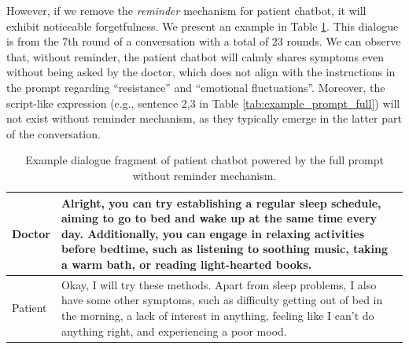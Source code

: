 However, if we remove the \textit{reminder} mechanism for patient chatbot, it will exhibit noticeable forgetfulness. We present an example in Table \ref{tab:example_prompt_v1}. This dialogue is from the 7th round of a conversation with a total of 23 rounds. We can observe that, without reminder, the patient chatbot will calmly shares symptoms even without being asked by the doctor, which does not align with the instructions in the prompt regarding ``resistance'' and ``emotional fluctuations''. Moreover, the script-like expression (e.g., sentence 2,3 in Table \ref{tab:example_prompt_full}) will not exist without reminder mechanism, as they typically emerge in the latter part of the conversation.

\begin{table}[h]
    \centering
    \footnotesize
    \begin{tabular}{m{}|m{}}
    \hline
     Doctor & Alright, you can try establishing a regular sleep schedule, aiming to go to bed and wake up at the same time every day. Additionally, you can engage in relaxing activities before bedtime, such as listening to soothing music, taking a warm bath, or reading light-hearted books.  \\
     \hline
     Patient & Okay, I will try these methods. Apart from sleep problems, I also have some other symptoms, such as difficulty getting out of bed in the morning, a lack of interest in anything, feeling like I can't do anything right, and experiencing a poor mood.\\
    \hline
    \end{tabular}
    \caption{Example dialogue fragment of patient chatbot powered by the full prompt without reminder mechanism.}
    \label{tab:example_prompt_v1}
\end{table}

